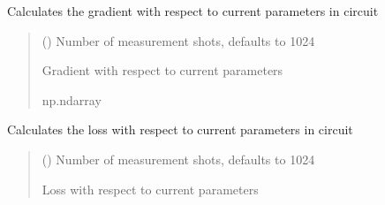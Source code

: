 \documentclass[letterpaper,10pt,english]{sphinxmanual}
\begin{document}
\begin{fulllineitems}

\begin{fulllineitems}
\label{\detokenize{qcompute_qapp.algorithm:qcompute_qapp.algorithm.QAOA.get_gradient}}
\pysigstartsignatures
{}
\pysigstopsignatures
\sphinxAtStartPar
Calculates the gradient with respect to current parameters in circuit
\begin{quote}\begin{description}
\sphinxAtStartPar
{} () \textendash{} Number of measurement shots, defaults to 1024

\sphinxAtStartPar
Gradient with respect to current parameters

\sphinxAtStartPar
np.ndarray

\end{description}\end{quote}

\end{fulllineitems}


\begin{fulllineitems}
\label{\detokenize{qcompute_qapp.algorithm:qcompute_qapp.algorithm.QAOA.get_loss}}
\pysigstartsignatures
{}
\pysigstopsignatures
\sphinxAtStartPar
Calculates the loss with respect to current parameters in circuit
\begin{quote}\begin{description}
\sphinxAtStartPar
{} () \textendash{} Number of measurement shots, defaults to 1024

\sphinxAtStartPar
Loss with respect to current parameters


\end{description}
\end{quote}
\end{fulllineitems}
\end{fulllineitems}
\end{document}
